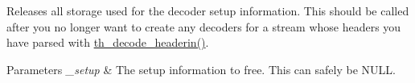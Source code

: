 Releases all storage used for the decoder setup information. This should be called after you no longer want to create any decoders for a stream whose headers you have parsed with \hyperlink{group__decfuncs_ga006d01d36fbe64768c571e6a12b7fc50}{th\+\_\+decode\+\_\+headerin()}. 
\begin{DoxyParams}{Parameters}
{\em \+\_\+setup} & The setup information to free. This can safely be {\ttfamily N\+U\+LL}. \\
\hline
\end{DoxyParams}
